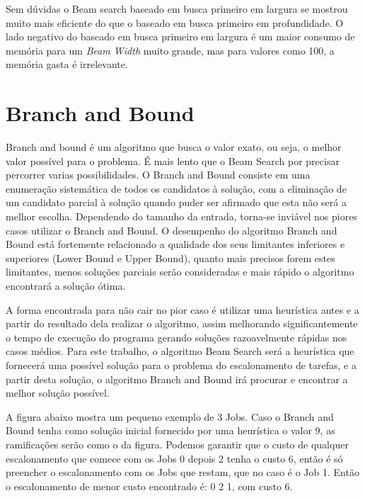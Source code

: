 \documentclass[a4paper,12pt]{article}
\begin{document}
Sem dúvidas o Beam search baseado em busca primeiro em largura se mostrou muito mais eficiente do que o baseado 
em busca primeiro em profundidade. O lado negativo do baseado em busca primeiro em largura é um maior consumo de 
memória para um \emph{Beam Width} muito grande, mas para valores como 100, a memória gasta é irrelevante.


\newpage

\section{Branch and Bound}

Branch and bound é um algoritmo que busca o valor exato, ou seja, o melhor valor possível para o problema. 
É mais lento que o Beam Search por precisar percorrer varias possibilidades. O Branch and Bound 
consiste em uma enumeração sistemática de todos os candidatos à solução, com a eliminação de um candidato parcial à 
solução quando puder ser afirmado que esta não será a melhor escolha. 
Dependendo do tamanho da entrada, torna-se inviável nos piores casos utilizar o Branch and Bound.
O desempenho do algoritmo Branch and Bound está fortemente relacionado a qualidade dos seus limitantes inferiores 
e superiores (Lower Bound e Upper Bound), quanto mais precisos forem estes limitantes, menos soluções parciais 
serão consideradas e mais rápido o algoritmo encontrará a solução ótima.

A forma encontrada para não cair no pior caso é utilizar uma heurística antes e a partir do resultado dela realizar 
o algoritmo, assim melhorando significantemente o tempo de execução do programa gerando soluções razoavelmente rápidas 
nos casos médios. Para este trabalho, o algoritmo Beam Search será a heurística que fornecerá uma possível solução para 
o problema do escalonamento de tarefas, e a partir desta solução, o algoritmo Branch and Bound irá procurar e encontrar 
a melhor solução possível.


A figura abaixo mostra um pequeno exemplo de 3 Jobs. Caso o Branch and Bound tenha como solução inicial 
fornecido por uma heurística o valor 9, as ramificações serão como o da figura. Podemos garantir que o custo 
de qualquer escalonamento que comece com os Jobs 0 depois 2 tenha o custo 6, então é só preencher o escalonamento 
com os Jobs que restam, que no caso é o Job 1. Então o escalonamento de menor custo encontrado é: 0 2 1, com custo 
6.
\end{document}
